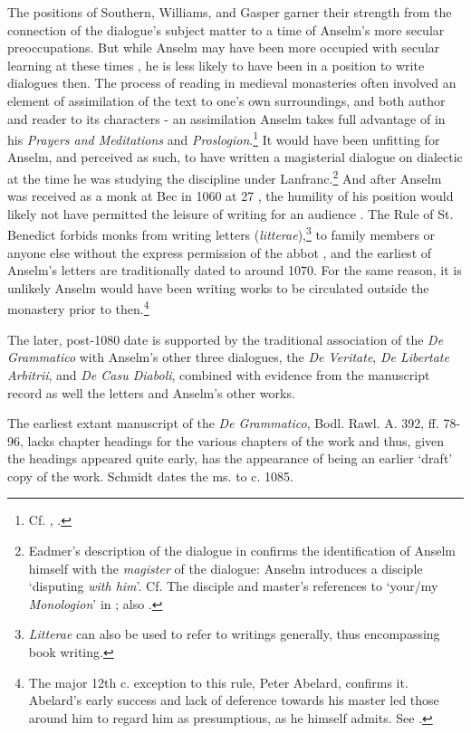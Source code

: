 \documentclass[]{article}
\begin{document}
The positions of Southern, Williams, and Gasper garner their strength from the connection of the dialogue's subject matter to a time of Anselm's more secular preoccupations. But while Anselm may have been more occupied with secular learning at these times \cite[VA I, 4-6]{VA}, he is less likely to have been in a position to write dialogues then. The process of reading in medieval monasteries often involved an element of assimilation of the text to one's own surroundings, and both author and reader to its characters - an assimilation Anselm takes full advantage of in his \textit{Prayers and Meditations} and \textit{Proslogion}.\footnote{Cf. \cite{McMahon2004}, \cite{Jordan1992}.} It would have been unfitting for Anselm, and perceived as such, to have written a magisterial dialogue on dialectic at the time he was studying the discipline under Lanfranc.\footnote{Eadmer's description of the dialogue in \cite[VA I, 25]{VA} confirms the identification of Anselm himself with the \textit{magister} of the dialogue: Anselm introduces a disciple `disputing \textit{with him}'. Cf. The disciple and master's references to `your/my \textit{Monologion}' in \cite[DV ch. 1, 10]{AnselmDV}; also \cite[pp. 398-400]{Novikoff2011}.} And after Anselm was received as a monk at Bec in 1060 at 27 \cite[VA I, 8]{VA}, the humility of his position would likely not have permitted the leisure of writing for an audience \cite[RSB ch. 5-7]{RSB}. The Rule of St. Benedict forbids monks from writing letters (\textit{litterae}),\footnote{\textit{Litterae} can also be used to refer to writings generally, thus encompassing book writing.} to family members or anyone else without the express permission of the abbot \cite[RSB ch. 54]{RSB}, and the earliest of Anselm's letters are traditionally dated to around 1070. For the same reason, it is unlikely Anselm would have been writing works to be circulated outside the monastery prior to then.\footnote{The major 12th c. exception to this rule, Peter Abelard, confirms it. Abelard's early success and lack of deference towards his master led those around him to regard him as presumptious, as he himself admits. See \cite[HC, ch. 2-4]{AbelardHC}.}

The later, post-1080 date is supported by the traditional association of the \textit{De Grammatico} with Anselm's other three dialogues, the \textit{De Veritate}, \textit{De Libertate Arbitrii}, and \textit{De Casu Diaboli}, combined with evidence from the manuscript record as well the letters and Anselm's other works. 

The earliest extant manuscript of the \textit{De Grammatico}, Bodl. Rawl. A. 392, ff. 78-96, lacks chapter headings for the various chapters of the work and thus, given the headings appeared quite early, has the appearance of being an earlier `draft' copy of the work. Schmidt dates the ms. to c. 1085. 
\end{document}
